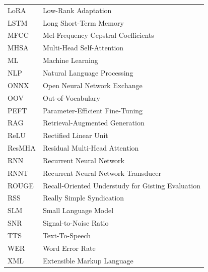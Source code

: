 \begin{longtable}[l]{@{}ll@{}}
LoRA & Low-Rank Adaptation \\
LSTM & Long Short-Term Memory \\
MFCC & Mel-Frequency Cepstral Coefficients \\
MHSA & Multi-Head Self-Attention \\
ML & Machine Learning \\
NLP & Natural Language Processing \\
ONNX & Open Neural Network Exchange \\
OOV & Out-of-Vocabulary \\
PEFT & Parameter-Efficient Fine-Tuning \\
RAG & Retrieval-Augmented Generation \\
ReLU & Rectified Linear Unit \\
ResMHA & Residual Multi-Head Attention \\
RNN & Recurrent Neural Network \\
RNNT & Recurrent Neural Network Transducer \\
ROUGE & Recall-Oriented Understudy for Gisting Evaluation \\
RSS & Really Simple Syndication \\
SLM & Small Language Model \\
SNR & Signal-to-Noise Ratio \\
TTS & Text-To-Speech \\
WER & Word Error Rate \\
XML & Extensible Markup Language \\

\end{longtable}

\pagebreak

